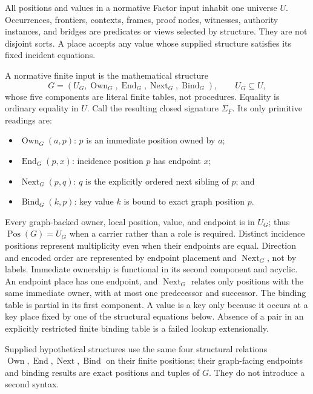 \documentclass[11pt,twoside]{article}
\begin{document}
All positions and values in a normative Factor input inhabit one universe \(U\).
Occurrences, frontiers, contexts, frames, proof nodes, witnesses, authority
instances, and bridges are predicates or views selected by structure.  They are
not disjoint sorts.  A place accepts any value whose supplied structure satisfies
its fixed incident equations.

A normative finite input is the mathematical structure
\[
 G=(U_G,\operatorname{Own}_G,\operatorname{End}_G,
       \operatorname{Next}_G,\operatorname{Bind}_G),
 \qquad U_G\subseteq U,
\]
whose five components are literal finite tables, not procedures.  Equality is
ordinary equality in \(U\).  Call the resulting closed signature \(\Sigma_F\).
Its only primitive readings are:

\begin{itemize}[leftmargin=2em]
  \item \(\operatorname{Own}_G(a,p)\): \(p\) is an immediate position owned by
        \(a\);
  \item \(\operatorname{End}_G(p,x)\): incidence position \(p\) has endpoint
        \(x\);
  \item \(\operatorname{Next}_G(p,q)\): \(q\) is the explicitly ordered next
        sibling of \(p\); and
  \item \(\operatorname{Bind}_G(k,p)\): key value \(k\) is bound to exact
        graph position \(p\).
\end{itemize}

Every graph-backed owner, local position, value, and endpoint is in \(U_G\); thus
\(\operatorname{Pos}(G)=U_G\) when a carrier rather than a role is required.
Distinct incidence positions represent multiplicity even when their endpoints are
equal.  Direction and encoded order are represented by endpoint placement and
\(\operatorname{Next}_G\), not by labels.  Immediate ownership is functional in
its second component and acyclic.  An endpoint place has one endpoint, and
\(\operatorname{Next}_G\) relates only positions with the same immediate owner,
with at most one predecessor and successor.  The binding table is partial in its
first component.  A value is a key only because it occurs at a key place fixed by
one of the structural equations below.  Absence of a pair in an explicitly
restricted finite binding table is a failed lookup extensionally.

Supplied hypothetical structures use the same four structural relations
\(\operatorname{Own},\operatorname{End},\operatorname{Next},\operatorname{Bind}\)
on their finite positions; their graph-facing endpoints and binding results are
exact positions and tuples of \(G\).  They do not introduce a second syntax.
\end{document}
